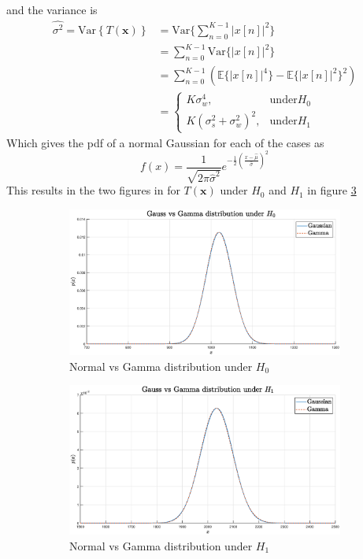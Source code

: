 and the variance is
\begin{align}
    \hat{\sigma^2} = \mathrm{Var}\left\{T(\mathbf{x})\right\} & = \mathrm{Var}\{\sum_{n=0}^{K-1}|x[n]|^2\}\nonumber\\
    & = \sum_{n=0}^{K-1}\mathrm{Var}\{|x[n]|^2\}\nonumber\\
    & = \sum_{n=0}^{K-1}(\mathbb{E}\{|x[n]|^4\}-\mathbb{E}\{|x[n]|^2\}^2\nonumber)\\
    & = \begin{cases}
    K\sigma_w^4, & \text{under} H_0\\
    K(\sigma_s^2+\sigma_w^2)^2, & \text{under} H_1
    \end{cases}
\end{align}
Which gives the pdf of a normal Gaussian for each of the cases as
\begin{equation}
    f(x) = \frac{1}{\sqrt{2\pi\hat{\sigma}^2}}e^{-\frac{1}{2}\left(\frac{x-\hat{\mu}}{\hat{\sigma}}\right)^2}
\end{equation}
This results in the two figures in for $T(\mathbf{x})$ under $H_0$ and $H_1$ in figure \ref{fig:clt}
\begin{figure}[ht]
    \begin{subfigure}{\textwidth}
        \centering
        \includegraphics[width=.8\linewidth]{figures/gauss_vs_gamma_h0.eps}  
        \caption{Normal vs Gamma distribution under $H_0$}
        \label{fig:gaussvsgamma_h0}
    \end{subfigure}
    \begin{subfigure}{\textwidth}
        \centering
        \includegraphics[width=.8\linewidth]{figures/gauss_vs_gamma_h1.eps}  
        \caption{Normal vs Gamma distribution under $H_1$}
        \label{fig:gaussvsgamma_h1}
    \end{subfigure}
    \caption{}
    \label{fig:clt}
\end{figure}
